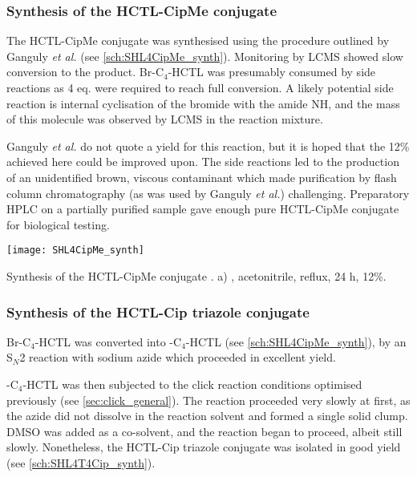 \subsubsection{Synthesis of the HCTL-CipMe conjugate }

The HCTL-CipMe conjugate  was synthesised using the procedure outlined by Ganguly \textit{et al.}\cite{Ganguly2011} (see \ref{sch:SHL4CipMe_synth}). Monitoring by LCMS showed slow conversion to the product. Br-C$_4$-HCTL  was presumably consumed by side reactions as 4 eq. were required to reach full conversion. 
A likely potential side reaction is internal cyclisation of the bromide with the amide NH, and the mass of this molecule was observed by LCMS in the reaction mixture.

Ganguly \textit{et al.} do not quote a yield for this reaction\cite{Ganguly2011,Iyer2012}, but it is hoped that the 12\% achieved here could be improved upon. The side reactions led to the production of an unidentified brown, viscous contaminant which made purification by flash column chromatography (as was used by Ganguly \textit{et al.}) challenging. Preparatory HPLC on a partially purified sample gave enough pure HCTL-CipMe conjugate  for biological testing. 



\begin{scheme}[H]
	\begin{center}
		\texttt{[image: SHL4CipMe\_synth]}
		\caption{
			Synthesis of the HCTL-CipMe conjugate .
			a) , acetonitrile, reflux, 24 h, 12\%.
			\label{sch:SHL4CipMe_synth}}
	\end{center}
\end{scheme}

\subsubsection{Synthesis of the HCTL-Cip triazole conjugate }

Br-C$_4$-HCTL  was converted into -C$_4$-HCTL  (see \ref{sch:SHL4CipMe_synth}), by an S$_N$2 reaction with sodium azide which proceeded in excellent yield. 

-C$_4$-HCTL  was then subjected to the click reaction conditions optimised previously (see \ref{sec:click_general}). The reaction proceeded very slowly at first, as the azide did not dissolve in the reaction solvent and formed a single solid clump. DMSO was added as a co-solvent, and the reaction began to proceed, albeit still slowly.  Nonetheless, the HCTL-Cip triazole conjugate  was isolated in good yield (see \ref{sch:SHL4T4Cip_synth}).

